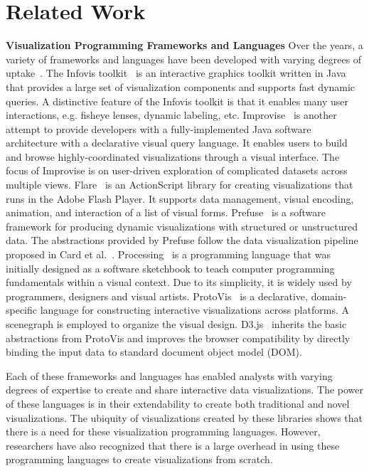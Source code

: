 \section{Related Work}
\label{s:relatedwork}

\noindent \textbf{Visualization Programming Frameworks and Languages}
Over the years, a variety of frameworks and languages have been developed with varying degrees of uptake~\cite{Haeberli:1988:SIG,Wilkinson:Grammar}.  The Infovis toolkit~\cite{Fekete:2004:VIS} is an interactive graphics toolkit written in Java that provides a large set of visualization components and supports fast dynamic queries. A distinctive feature of the Infovis toolkit is that it enables many user interactions, e.g. fisheye lenses, dynamic labeling, etc. Improvise~\cite{Weaver:2004:VIS} is another attempt to provide developers with a fully-implemented Java software architecture with a declarative visual query language. It enables users to build and browse highly-coordinated visualizations through a visual interface. The focus of Improvise is on user-driven exploration of complicated datasets across multiple views. Flare~\cite{Flare} is an ActionScript library for creating visualizations that runs in the Adobe Flash Player. It supports data management, visual encoding, animation, and interaction of a list of visual forms. Prefuse~\cite{Heer:2005:CHI} is a software framework for producing dynamic visualizations with structured or unstructured data. The abstractions provided by Prefuse follow the data visualization pipeline proposed in Card et al.~\cite{Card:1999}. Processing~\cite{Processing} is a programming language that was initially designed as a software sketchbook to teach computer programming fundamentals within a visual context. Due to its simplicity, it is widely used by programmers, designers and visual artists. ProtoVis~\cite{Heer:2009:TVCG,Heer:2010:TVCG} is a declarative, domain-specific language for constructing interactive visualizations across platforms. A scenegraph is employed to organize the visual design. D3.js~\cite{Heer:2011:TVCG} inherits the basic abstractions from ProtoVis and improves the browser compatibility by directly binding the input data to standard document object model (DOM).

Each of these frameworks and languages has enabled analysts with varying degrees of expertise to create and share interactive data visualizations.  The power of these languages is in their extendability to create both traditional and novel visualizations.  The ubiquity of visualizations created by these libraries shows that there is a need for these visualization programming languages.  However, researchers have also recognized that there is a large overhead in using these programming languages to create visualizations from scratch.

